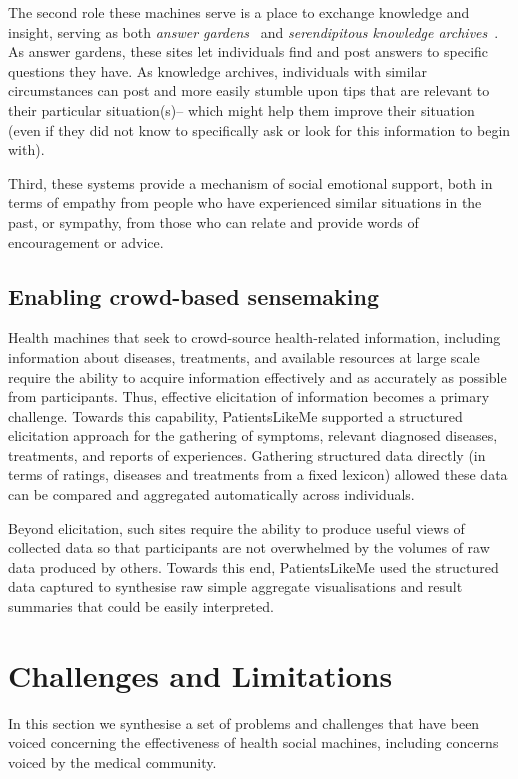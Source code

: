 \documentclass{sig-alternate}
\begin{document}
The second role these machines serve is a place to exchange knowledge
and insight, serving as both \emph{answer gardens}~\cite{answergarden}
and \emph{serendipitous knowledge archives}~\cite{knowledgearchive}.
As answer gardens, these sites let individuals find and post answers
to specific questions they have.  As knowledge archives, individuals
with similar circumstances can post and more easily stumble upon tips
that are relevant to their particular situation(s)-- which might help
them improve their situation (even if they did not know to
specifically ask or look for this information to begin with).

Third, these systems provide a mechanism of social emotional support,
both in terms of empathy from people who have experienced similar
situations in the past, or sympathy, from those who can relate and
provide words of encouragement or advice.

\subsection{Enabling crowd-based sensemaking}

Health machines that seek to crowd-source health-related information,
including information about diseases, treatments, and available
resources at large scale require the ability to acquire information
effectively and as accurately as possible from participants.  Thus,
effective elicitation of information becomes a primary challenge.
Towards this capability, PatientsLikeMe supported a structured
elicitation approach for the gathering of symptoms, relevant diagnosed
diseases, treatments, and reports of experiences.  Gathering
structured data directly (in terms of ratings, diseases and treatments
from a fixed lexicon) allowed these data can be compared and
aggregated automatically across individuals.

Beyond elicitation, such sites require the ability to produce useful
views of collected data so that participants are not overwhelmed by
the volumes of raw data produced by others.  Towards this end,
PatientsLikeMe used the structured data captured to synthesise raw
simple aggregate visualisations and result summaries that could be
easily interpreted.

\section{Challenges and Limitations}
\label{sec:limitations}

In this section we synthesise a set of problems and challenges that
have been voiced concerning the effectiveness of health social
machines, including concerns voiced by the medical community. 
\end{document}
